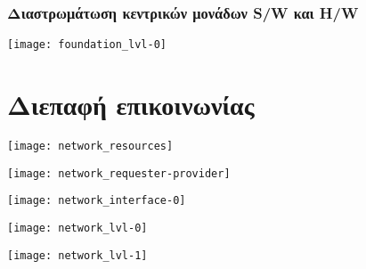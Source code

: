 \documentclass[xetex,mathserif,serif]{beamer}
\begin{document}
\begin{frame}\frametitle
    {Διαστρωμάτωση κεντρικών μονάδων S\slash{}W και H\slash{}W}

    \begin{center}
    \texttt{[image: foundation\_lvl-0]}
    \end{center}
\end{frame}






\section{Διεπαφή επικοινωνίας}

\begin{frame}
    \begin{center}
    \texttt{[image: network\_resources]}
    \end{center}
\end{frame}

\begin{frame}
    \begin{center}
    \texttt{[image: network\_requester-provider]}
    \end{center}
\end{frame}

\begin{frame}
    \begin{center}
    \texttt{[image: network\_interface-0]}
    \end{center}
\end{frame}


\begin{frame}
    \begin{center}
    \texttt{[image: network\_lvl-0]}
    \end{center}
\end{frame}

\begin{frame}
    \begin{center}
    \texttt{[image: network\_lvl-1]}
    \end{center}
\end{frame}

%    




\end{document}
